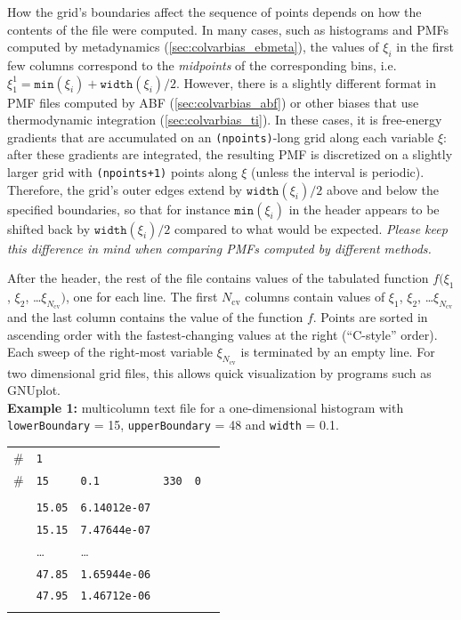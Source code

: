 How the grid's boundaries affect the sequence of points depends on how the contents of the file were computed.  In many cases, such as histograms and PMFs computed by metadynamics (\ref{sec:colvarbias_ebmeta}), the values of $\xi_i$ in the first few columns correspond to the \emph{midpoints} of the corresponding bins, i.e.\ $\xi^{1}_{1} = \mathtt{min}(\xi_{i}) + \mathtt{width}(\xi_{i})/2$.
However, there is a slightly different format in PMF files computed by ABF (\ref{sec:colvarbias_abf}) or other biases that use thermodynamic integration (\ref{sec:colvarbias_ti}).
In these cases, it is free-energy gradients that are accumulated on an \texttt{(npoints)}-long grid along each variable $\xi$: after these gradients are integrated, the resulting PMF is discretized on a slightly larger grid with \texttt{(npoints+1)} points along $\xi$ (unless the interval is periodic).
Therefore, the grid's outer edges extend by $\mathtt{width}(\xi_{i})/2$ above and below the specified boundaries, so that for instance $\mathtt{min}(\xi_{i})$ in the header appears to be shifted back by $\mathtt{width}(\xi_{i})/2$ compared to what would be expected.  \emph{Please keep this difference in mind when comparing PMFs computed by different methods.}

After the header, the rest of the file contains values of the tabulated function
$f(\xi_{1}$, $\xi_{2}$, \ldots $\xi_{N_{\mathrm{cv}}})$, one for each line.
The first $N_{\mathrm{cv}}$ columns contain values of $\xi_{1}$, $\xi_{2}$, \ldots $\xi_{N_{\mathrm{cv}}}$ and the last column contains the value of the function $f$.
Points are sorted in ascending order with the fastest-changing values at the right (``C-style'' order).
Each sweep of the right-most variable $\xi_{N_{\mathrm{cv}}}$ is terminated by an empty line.
For two dimensional grid files, this allows quick visualization by programs such as GNUplot.
\\

\noindent\textbf{Example 1:} multicolumn text file for a one-dimensional histogram with \texttt{lowerBoundary} = 15, \texttt{upperBoundary} = 48 and \texttt{width} = 0.1.

\begin{tabular}{l l l l l l}
\\
\# & \texttt{1} & & & & \\
\# & \texttt{15} & \texttt{0.1} & \texttt{330} & \texttt{0} \\
\\
& \texttt{15.05} & \texttt{6.14012e-07} & & & \\
& \texttt{15.15} & \texttt{7.47644e-07} & & & \\
& \ldots & \ldots & & & \\
& \texttt{47.85} & \texttt{1.65944e-06} & & & \\
& \texttt{47.95} & \texttt{1.46712e-06} & & & \\
\\
\end{tabular}

